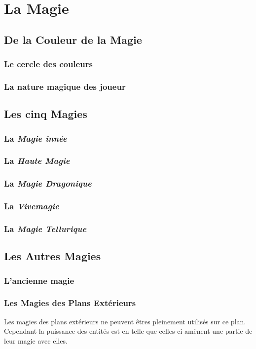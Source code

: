 \chapter{La Magie}
\section{De la Couleur de la Magie}
\label{Couleur}
\subsection{Le cercle des couleurs}
\subsection{La nature magique des joueur}
\section{Les cinq Magies}
\subsection{La {\em Magie innée}}
\subsection{La {\em Haute Magie}}
\subsection{La {\em Magie Dragonique}}
\subsection{La {\em Vivemagie}}
\subsection{La {\em Magie Tellurique}}
\section{Les Autres Magies}
\subsection{L'ancienne magie}
\subsection{Les Magies des Plans Extérieurs}
Les magies des plans extérieurs ne peuvent êtres pleinement utilisés sur ce plan.
Cependant la puissance des entités est en telle que celles-ci amènent une partie de leur magie avec elles.

